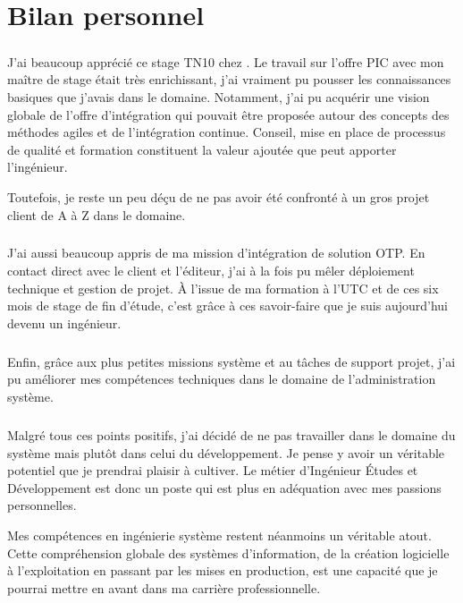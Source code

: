 \chapter{Bilan personnel}

\paragraph{}
J'ai beaucoup apprécié ce stage TN10 chez \asmile.
Le travail sur l'offre PIC avec mon maître de stage \agulet{} était très enrichissant, j'ai vraiment pu pousser les connaissances basiques que j'avais dans le domaine.
Notamment, j'ai pu acquérir une vision globale de l'offre d'intégration qui pouvait être proposée autour des concepts des méthodes agiles et de l'intégration continue.
Conseil, mise en place de processus de qualité et formation constituent la valeur ajoutée que peut apporter l'ingénieur.

Toutefois, je reste un peu déçu de ne pas avoir été confronté à un gros projet client de A à Z dans le domaine.

\paragraph{}
J'ai aussi beaucoup appris de ma mission d'intégration de solution OTP.
En contact direct avec le client et l'éditeur, j'ai à la fois pu mêler déploiement technique et gestion de projet.
À l'issue de ma formation à l'UTC et de ces six mois de stage de fin d'étude, c'est grâce à ces savoir-faire que je suis aujourd'hui devenu un ingénieur. 

\paragraph{}
Enfin, grâce aux plus petites missions système et au tâches de support projet, j'ai pu améliorer mes compétences techniques dans le domaine de l'administration système.

\paragraph{}
Malgré tous ces points positifs, j'ai décidé de ne pas travailler dans le domaine du système mais plutôt dans celui du développement.
Je pense y avoir un véritable potentiel que je prendrai plaisir à cultiver.
Le métier d'Ingénieur Études et Développement est donc un poste qui est plus en adéquation avec mes passions personnelles.

Mes compétences en ingénierie système restent néanmoins un véritable atout.
Cette compréhension globale des systèmes d'information, de la création logicielle à l'exploitation en passant par les mises en production, est une capacité que je pourrai mettre en avant dans ma carrière professionnelle.

